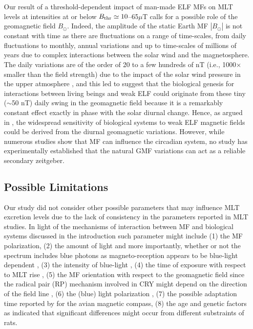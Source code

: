 \documentclass[letter]{article}
\begin{document}
Our result of a threshold-dependent impact of man-made ELF MFs on MLT levels at intensities at or below $B_{\rm thr}\simeq10$--65$\mu$T  calls for a possible  role of the geomagnetic field $B_{\odot}$.  Indeed, the amplitude of the static Earth MF $|B_{\odot}|$ is not constant with time as there are fluctuations on a range of time-scales, from daily fluctuations
to monthly, annual variations and up to  time-scales of millions of years \citep[see e.g.][]{CourtillotV_1988} due to complex interactions between the solar wind and the magnetosphere.  The daily variations are of the order of 20 to a few hundreds of  nT (i.e., 1000$\times$ smaller than the field strength)
 due to the impact of the solar wind pressure in the upper atmosphere \citep[e.g.][]{Hitchman1998},   
and this led \citet{Liboff2013}  to suggest that the
biological genesis for interactions between living beings and weak ELF could originate from these tiny ($\sim$50 nT) daily swing in the geomagnetic field    because it is a remarkably constant effect exactly in phase with the solar diurnal change.  Hence, as argued in  \citet{Liboff2013},  the widespread sensitivity of biological systems to weak ELF magnetic fields could be  derived from the diurnal geomagnetic variations.
However, while numerous studies show that MF
can influence the circadian system, no study has experimentally established that the natural GMF variations can act as a reliable secondary zeitgeber.
 


\subsection*{Possible Limitations}
\label{section:limitations}

Our study did not consider other possible parameters that may influence MLT excretion levels due to the lack of consistency in the parameters reported in MLT studies.
In light of the mechanisms of interaction between MF and biological systems discussed in the introduction %
such parameter might include
 (1) the MF polarization, 
 (2) the amount of light and more importantly, whether or not the spectrum includes blue photons  as magneto-reception appears to be blue-light dependent \citep[e.g.][]{Chasmore1999,Chaves2011,Gegear2008,Michael2017,Ritz2000,Vanderstraeten2018}, 
 (3) the intensity of blue-light \citep[as magneto-reception might be inversely proportional to the photon flux, e.g.][]{Vanderstraeten2018},
 (4) the  time of exposure with respect to MLT rise \citep[as suggested by][]{Wood1998,Vanderstraeten2012},
  (5) the  MF orientation with respect to the geomagnetic field since the radical pair (RP) mechanism involved in CRY
might depend on the direction of the field line \citep{Wiltschko2014,Zhang2015},
 (6)  the (blue) light polarization \citep[as discussed in][]{Stoneham2012,Hore2016},
 (7) the possible adaptation time reported by \citet{Wiltschko2014} for the avian magnetic compass,
 (8) the age \citep{Vanderstraeten2012} and genetic factors as \citet{Fedrowitz2004} indicated that significant differences might occur from different substraints of rats.
 
\end{document}
